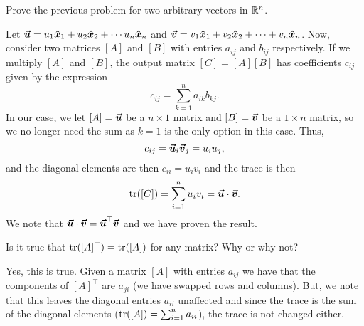 \documentclass[12pt]{article} %
\begin{document}
\newpage
\begin{problem}
Prove the previous problem for two arbitrary vectors in $\mathbb{R}^n$.
\end{problem}
\begin{solution}
    Let $\boldsymbol{\boldsymbol{\vec{u}}} = u_1 \boldsymbol{\hat{x}}_1 + u_2 \boldsymbol{\hat{x}}_2 + \cdots u_n \boldsymbol{\hat{x}}_n$ and $\boldsymbol{\boldsymbol{\vec{v}}} = v_1 \boldsymbol{\hat{x}}_1 + v_2 \boldsymbol{\hat{x}}_2 + \cdots + v_n \boldsymbol{\hat{x}}_n$. Now, consider two matrices $[A]$ and $[B]$ with entries $a_{ij}$ and $b_{ij}$ respectively. If we multiply $[A]$ and $[B]$, the output matrix $[C] = [A][B]$ has coefficients $c_{ij}$ given by the expression
    \[
        c_{ij} = \sum_{k=1}^n a_{ik}b_{kj}.
    \]
    In our case, we let $[A]=\boldsymbol{\boldsymbol{\vec{u}}}$ be a $n\times 1$ matrix and $[B]=\boldsymbol{\boldsymbol{\vec{v}}}$ be a $1\times n$ matrix, so we no longer need the sum as $k=1$ is the only option in this case. Thus,
    \[
        c_{ij} = \boldsymbol{\boldsymbol{\vec{u}}}_i \boldsymbol{\boldsymbol{\vec{v}}}_j = u_i u_j,
    \]
    and the diagonal elements are then $c_{ii} = u_i v_i$ and the trace is then
    \[
        \mathrm{tr}([C]) = \sum_{i=1}^n u_i v_i = \boldsymbol{\boldsymbol{\vec{u}}} \cdot \boldsymbol{\boldsymbol{\vec{v}}}.
    \]
    We note that $\boldsymbol{\boldsymbol{\vec{u}}} \cdot \boldsymbol{\boldsymbol{\vec{v}}} = \boldsymbol{\boldsymbol{\vec{u}}}^\top \boldsymbol{\boldsymbol{\vec{v}}}$ and we have proven the result.
\end{solution}

\newpage
\begin{problem}
Is it true that $\mathrm{tr}([A]^\top)=\mathrm{tr}([A])$ for any matrix? Why or why not?
\end{problem}
\begin{solution}
    Yes, this is true.  Given a matrix $[A]$ with entries $a_{ij}$ we have that the components of $[A]^\top$ are $a_{ji}$ (we have swapped rows and columns).  But, we note that this leaves the diagonal entries $a_{ii}$ unaffected and since the trace is the sum of the diagonal elements ($\mathrm{tr}([A]) = \sum_{i=1}^n a_{ii}$), the trace is not changed either.
\end{solution}
\end{document}
